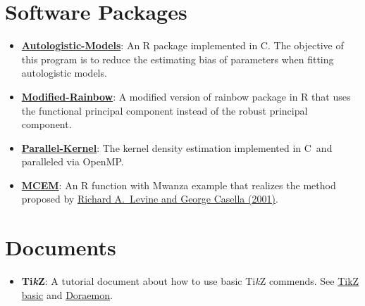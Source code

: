 \documentclass[a4paper,10pt,dvipdfmx]{article}
\def\CC{{C\nolinebreak[4]\hspace{-.05em}\raisebox{.4ex}{\tiny\bf ++}}}
\begin{document}
\section*{Software Packages}
\begin{itemize}[noitemsep,nolistsep]
  \item \href{https://github.com/Chris7462/Autologistic-Models}{\textbf{Autologistic-Models}}: An \textsf{R} package implemented in \CC. The objective of this program is to reduce the estimating bias of parameters when fitting autologistic models.
  \item \href{https://github.com/Chris7462/Modified-Rainbow}{\textbf{Modified-Rainbow}}: A modified version of rainbow package in \textsf{R} that uses the functional principal component instead of the robust principal component.
  \item \href{https://github.com/Chris7462/Parallel-Kernel}{\textbf{Parallel-Kernel}}: The kernel density estimation implemented in \CC~and paralleled via OpenMP.
  \item \href{https://github.com/Chris7462/Monte-Carlo-EM-Algorithm}{\textbf{MCEM}}: An \textsf{R} function with Mwanza example that realizes the method proposed by \href{https://www.jstor.org/stable/1391097}{Richard A.~Levine and George Casella (2001)}.
\end{itemize}

\section*{Documents}
\begin{itemize}[noitemsep,nolistsep]
  \item \textbf{Ti\textit{k}Z}: A tutorial document about how to use basic Ti\textit{k}Z commends. See \href{https://github.com/Chris7462/TikZ/blob/master/TikZ_basic.pdf}{TikZ basic} and \href{https://github.com/Chris7462/TikZ/blob/master/Examples/Doraemon.pdf}{Doraemon}.
\end{itemize}
\end{document}
